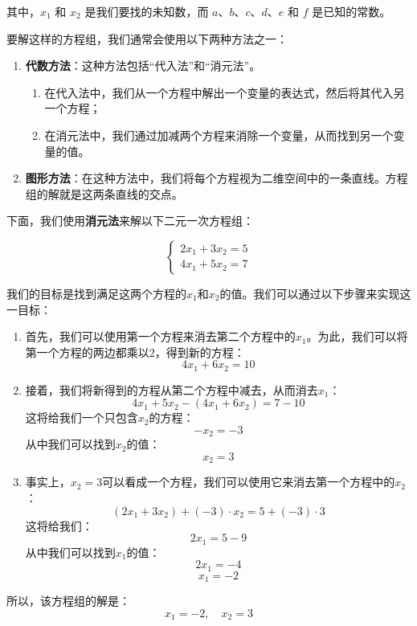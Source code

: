 \documentclass[lang=cn,newtx,10pt,scheme=chinese]{elegantbook}
\begin{document}
其中，\(x_1\) 和 \(x_2\) 是我们要找的未知数，而 \(a\)、\(b\)、\(c\)、\(d\)、\(e\) 和 \(f\) 是已知的常数。

要解这样的方程组，我们通常会使用以下两种方法之一：
\begin{enumerate}
    \item \textbf{代数方法}：这种方法包括“代入法”和“消元法”。
    \begin{enumerate}
        \item 在代入法中，我们从一个方程中解出一个变量的表达式，然后将其代入另一个方程；
        \item 在消元法中，我们通过加减两个方程来消除一个变量，从而找到另一个变量的值。
    \end{enumerate}
    \item \textbf{图形方法}：在这种方法中，我们将每个方程视为二维空间中的一条直线。方程组的解就是这两条直线的交点。
\end{enumerate}


下面，我们使用\textbf{消元法}来解以下二元一次方程组：

\begin{equation}
\left\{
\begin{array}{l}
2x_1 + 3x_2 = 5\\
4x_1 + 5x_2 = 7
\end{array}
\right.
\label{eq:二元一次方程组示例}
\end{equation}

我们的目标是找到满足这两个方程的\(x_1\)和\(x_2\)的值。我们可以通过以下步骤来实现这一目标：

\begin{enumerate}
    \item 首先，我们可以使用第一个方程来消去第二个方程中的\(x_1\)。为此，我们可以将第一个方程的两边都乘以2，得到新的方程：
    \[
    4x_1 + 6x_2 = 10
    \]
    \item 接着，我们将新得到的方程从第二个方程中减去，从而消去\(x_1\)：
    \[
    4x_1 + 5x_2 - (4x_1 + 6x_2) = 7 - 10
    \]
    这将给我们一个只包含\(x_2\)的方程：
    \[
    -x_2 = -3
    \]
    从中我们可以找到\(x_2\)的值：
    \[
    x_2 = 3
    \]
    \item 事实上，\(x_2 = 3\)可以看成一个方程，我们可以使用它来消去第一个方程中的\(x_2\)：
    \[
    (2x_1 + 3x_2) + (-3) \cdot x_2 = 5 + (-3) \cdot 3
    \]
    这将给我们：
    \[
    2x_1 = 5 - 9
    \]
    从中我们可以找到\(x_1\)的值：
    \[
    2x_1 = -4
    \]
    \[
    x_1 = -2
    \]
\end{enumerate}

所以，该方程组的解是：
\[
x_1 = -2, \quad x_2 = 3
\]
\end{document}
